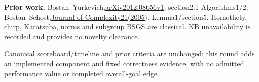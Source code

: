 \documentclass[10pt]{article}
\begin{document}
\textbf{Prior work.}
Bostan--Yurkevich,\href{https://arxiv.org/pdf/2012.08656v1}{arXiv2012.08656v1},
section2.1 Algorithms1/2; Bostan--Schost,\href{https://mathexp.eu/bostan/publications/BoSc05.pdf}{Journal of Complexity21(2005)},
Lemma1/section5. Homothety, chirp, Karatsuba, norms and subgroup BSGS are classical.
KB unavailability is recorded and provides no novelty clearance.

Canonical scoreboard/timeline and prior criteria are unchanged: this round adds
an implemented component and fixed correctness evidence, with no admitted
performance value or completed overall-goal edge.
\end{document}
